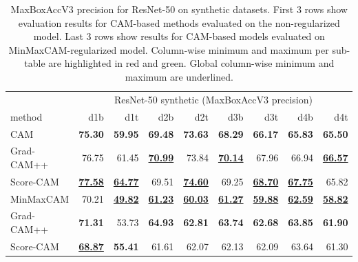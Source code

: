 \begin{table}[h]
\centering
\begin{tabular}{lrrrrrrrr}
\toprule
 & \multicolumn{8}{c}{ResNet-50 synthetic (MaxBoxAccV3 precision)} \\
method & d1b & d1t & d2b & d2t & d3b & d3t & d4b & d4t \\
\cmidrule(lr){1-1} \cmidrule(lr){2-9}
CAM & \color{purple} \bfseries 75.30 & \color{purple} \bfseries 59.95 & \color{purple} \bfseries 69.48 & \color{purple} \bfseries 73.63 & \color{purple} \bfseries 68.29 & \color{purple} \bfseries 66.17 & \color{purple} \bfseries 65.83 & \color{purple} \bfseries 65.50 \\
Grad-CAM++ & 76.75 & 61.45 & \color{teal} \bfseries \underline{70.99} & 73.84 & \color{teal} \bfseries \underline{70.14} & 67.96 & 66.94 & \color{teal} \bfseries \underline{66.57} \\
Score-CAM & \color{teal} \bfseries \underline{77.58} & \color{teal} \bfseries \underline{64.77} & 69.51 & \color{teal} \bfseries \underline{74.60} & 69.25 & \color{teal} \bfseries \underline{68.70} & \color{teal} \bfseries \underline{67.75} & 65.82 \\
\cmidrule(lr){1-1} \cmidrule(lr){2-9}
MinMaxCAM & 70.21 & \color{purple} \bfseries \underline{49.82} & \color{purple} \bfseries \underline{61.23} & \color{purple} \bfseries \underline{60.03} & \color{purple} \bfseries \underline{61.27} & \color{purple} \bfseries \underline{59.88} & \color{purple} \bfseries \underline{62.59} & \color{purple} \bfseries \underline{58.82} \\
Grad-CAM++ & \color{teal} \bfseries 71.31 & 53.73 & \color{teal} \bfseries 64.93 & \color{teal} \bfseries 62.81 & \color{teal} \bfseries 63.74 & \color{teal} \bfseries 62.68 & \color{teal} \bfseries 63.85 & \color{teal} \bfseries 61.90 \\
Score-CAM & \color{purple} \bfseries \underline{68.87} & \color{teal} \bfseries 55.41 & 61.61 & 62.07 & 62.13 & 62.09 & 63.64 & 61.30 \\
\bottomrule
\end{tabular}
\caption[MaxBoxAccV3 precision for ResNet-50 on synthetic datasets]{MaxBoxAccV3 precision for ResNet-50 on synthetic datasets. First 3 rows show evaluation results for CAM-based methods evaluated on the non-regularized model. Last 3 rows show results for CAM-based models evaluated on MinMaxCAM-regularized model. Column-wise minimum and maximum per sub-table are highlighted in red and green. Global column-wise minimum and maximum are underlined.}
\label{tab:maxboxaccv3_precision_resnet50_synthetic}
\end{table}

